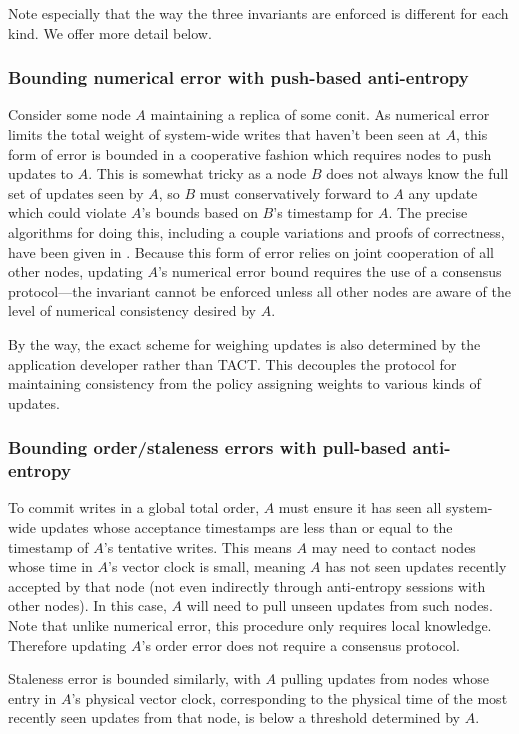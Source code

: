 Note especially that the way the three invariants are enforced is
different for each kind. We offer more detail below.


\subsubsection{Bounding numerical error with push-based anti-entropy}

Consider some node $A$ maintaining a replica of some conit. As
numerical error limits the total weight of system-wide writes that
haven't been seen at $A$, this form of error is bounded in a
cooperative fashion which requires nodes to push updates to $A$. This
is somewhat tricky as a node $B$ does not always know the full set of
updates seen by $A$, so $B$ must conservatively forward to $A$ any
update which could violate $A$'s bounds based on $B$'s timestamp for
$A$.  The precise algorithms for doing this, including a couple
variations and proofs of correctness, have been given in
\cite{2000tactalgorithms}. Because this form of error relies on joint
cooperation of all other nodes, updating $A$'s numerical error bound
requires the use of a consensus protocol---the invariant cannot be
enforced unless all other nodes are aware of the level of numerical
consistency desired by $A$.

By the way, the exact scheme for weighing updates is also determined
by the application developer rather than TACT. This decouples the
protocol for maintaining consistency from the policy assigning weights
to various kinds of updates.

\subsubsection{Bounding order/staleness errors with pull-based anti-entropy}

To commit writes in a global total order, $A$ must ensure it has seen
all system-wide updates whose acceptance timestamps are less than or
equal to the timestamp of $A$'s tentative writes. This means $A$ may
need to contact nodes whose time in $A$'s vector clock is small,
meaning $A$ has not seen updates recently accepted by that node (not
even indirectly through anti-entropy sessions with other nodes). In
this case, $A$ will need to pull unseen updates from such nodes. Note
that unlike numerical error, this procedure only requires local
knowledge. Therefore updating $A$'s order error does not require a
consensus protocol.

Staleness error is bounded similarly, with $A$ pulling updates from
nodes whose entry in $A$'s physical vector clock, corresponding to the
physical time of the most recently seen updates from that node, is
below a threshold determined by $A$.


